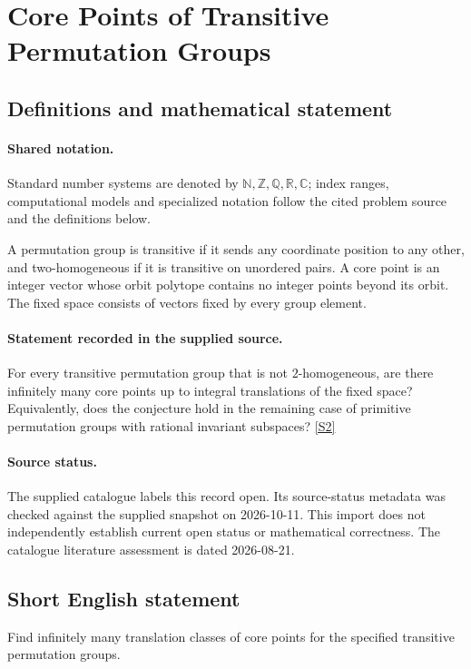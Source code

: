 \documentclass[11pt]{article}
\newcommand{\sref}[2]{\hyperlink{source:#1:#2}{[S#2]}}
\begin{document}
\section{Core Points of Transitive Permutation Groups}\label{statement}

\subsection{Definitions and mathematical statement}

\paragraph{Shared notation.}Standard number systems are denoted by $\mathbb N,\mathbb Z,\mathbb Q,\mathbb R,\mathbb C$; index ranges, computational models and specialized notation follow the cited problem source and the definitions below.


A permutation group is transitive if it sends any coordinate position to any other, and two-homogeneous if it is transitive on unordered pairs. A core point is an integer vector whose orbit polytope contains no integer points beyond its orbit. The fixed space consists of vectors fixed by every group element.
\paragraph{Statement recorded in the supplied source.}
For every transitive permutation group that is not $2$-homogeneous, are there infinitely many core points up to integral translations of the fixed space? Equivalently, does the conjecture hold in the remaining case of primitive permutation groups with rational invariant subspaces? \sref{statement}{2}
\paragraph{Source status.}
The supplied catalogue labels this record open. Its source-status metadata was checked against the supplied snapshot on 2026-10-11. This import does not independently establish current open status or mathematical correctness. The catalogue literature assessment is dated 2026-08-21.
\subsection{Short English statement}
Find infinitely many translation classes of core points for the specified transitive permutation groups.
\end{document}
